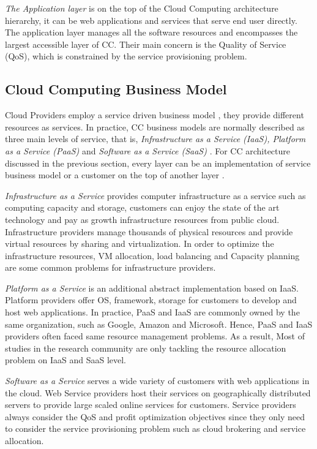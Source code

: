 \documentclass[onecolumn,10pt]{asme2ej}
\begin{document}
\emph{The Application layer} is on the top of the Cloud Computing architecture hierarchy, it can be web applications and services that serve end user directly. The application layer manages all the software resources and encompasses the largest accessible layer of CC. Their main concern is the Quality of Service (QoS), which is constrained by the service provisioning problem.

\subsection{Cloud Computing Business Model}
Cloud Providers employ a service driven business model \cite{foster2008cloud}, they provide different resources as services. In practice, CC business models are normally described as three main levels of service, that is, \emph{Infrastructure as a Service (IaaS), Platform as a Service (PaaS)} and \emph{Software as a Service (SaaS)} \cite{parikh2013survey}. For CC architecture discussed in the previous section, every layer can be an implementation of service business model or a customer on the top of another layer \cite{vaquero2008break}. 

\emph{Infrastructure as a Service} provides computer infrastructure as a service such as computing capacity and storage, customers can enjoy the state of the art technology and pay as growth infrastructure resources from public cloud. Infrastructure providers manage thousands of physical resources and provide virtual resources by sharing and virtualization. In order to optimize the infrastructure resources, VM allocation, load balancing and Capacity planning are some common problems for infrastructure providers.

\emph{Platform as a Service} is an additional abstract implementation based on IaaS. Platform providers offer OS, framework, storage for customers to develop and host web applications. In practice, PaaS and IaaS are commonly owned by the same organization, such as Google, Amazon and Microsoft. Hence, PaaS and IaaS providers often faced same resource management problems. As a result, Most of studies in the research community are only tackling the resource allocation problem on IaaS and SaaS level.

\emph{Software as a Service} serves a wide variety of customers with web applications in the cloud. Web Service providers host their services on geographically distributed servers to provide large scaled online services for customers. Service providers always consider the QoS and profit optimization objectives since they only need to consider the service provisioning problem such as cloud brokering and service allocation. 
\end{document}
